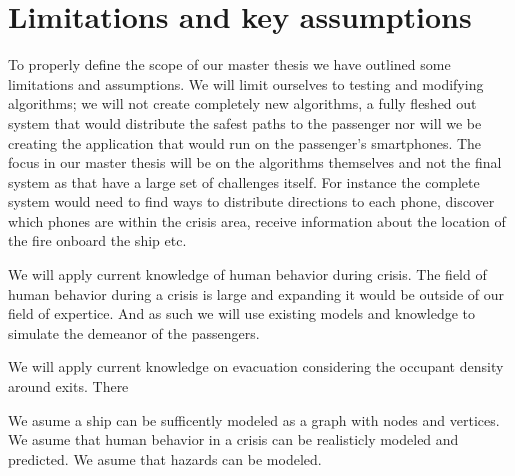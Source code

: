 \chapter{Limitations and key assumptions}
\label{ch:limitations}





To properly define the scope of our master thesis we have outlined
some limitations and assumptions. We will limit ourselves to testing and modifying algorithms;
we will not create completely new algorithms, a fully fleshed out system that would distribute the
safest paths to the passenger nor will we be creating the application that would run on the passenger's smartphones.
The focus in our master thesis will be on the algorithms themselves and not the final system as that have a large set
of challenges itself. For instance the complete system would need to find ways to distribute directions to each phone,
discover which phones are within the crisis area, receive information about the location of the fire onboard the ship etc.

We will apply current knowledge of human behavior during crisis. The field of human behavior during a crisis is large
and expanding it would be outside of our field of expertice. And as such we will use existing models and knowledge
to simulate the demeanor of the passengers. 

We will apply current knowledge on evacuation considering the occupant density around exits. There 


We asume a ship can be sufficently modeled as a graph with nodes and vertices. 
We asume that human behavior in a crisis can be realisticly modeled and
predicted. We asume that hazards can be modeled.
